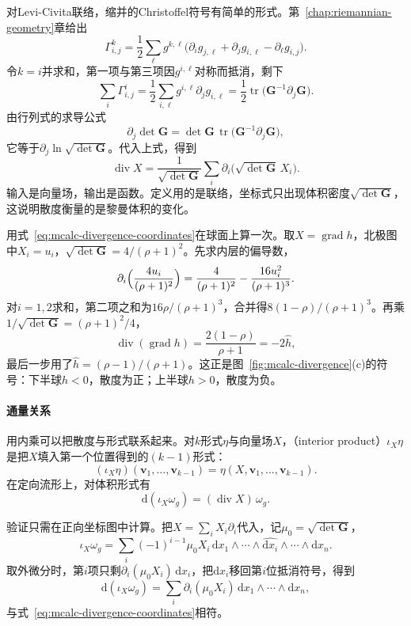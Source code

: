 对Levi-Civita联络，缩并的Christoffel符号有简单的形式。第~\ref{chap:riemannian-geometry}章给出
\[
\Gamma^k_{i,j}=\frac12\sum_\ell g^{k,\ell}\bigl(\partial_ig_{j,\ell}+\partial_jg_{i,\ell}-\partial_\ell g_{i,j}\bigr).
\]
令$k=i$并求和，第一项与第三项因$g^{i,\ell}$对称而抵消，剩下
\[
\sum_i\Gamma^i_{i,j}=\frac12\sum_{i,\ell}g^{i,\ell}\partial_jg_{i,\ell}=\frac12\operatorname{tr}\bigl(\bm G^{-1}\partial_j\bm G\bigr).
\]
由行列式的求导公式
\[
\partial_j\det\bm G=\det\bm G\,\operatorname{tr}\bigl(\bm G^{-1}\partial_j\bm G\bigr),
\]
它等于$\partial_j\ln\sqrt{\det\bm G}$。代入上式，得到
\begin{equation}
\operatorname{div}X=\frac1{\sqrt{\det\bm G}}\sum_i\partial_i\bigl(\sqrt{\det\bm G}\,X_i\bigr).
\label{eq:mcalc-divergence-coordinates}
\end{equation}
输入是向量场，输出是函数。定义用的是联络，坐标式只出现体积密度$\sqrt{\det\bm G}$，这说明散度衡量的是黎曼体积的变化。

用式~\eqref{eq:mcalc-divergence-coordinates}在球面上算一次。取$X=\operatorname{grad}h$，北极图中$X_i=u_i$，$\sqrt{\det\bm G}=4/(\rho+1)^2$。先求内层的偏导数，
\[
\partial_i\Bigl(\frac{4u_i}{(\rho+1)^2}\Bigr)=\frac4{(\rho+1)^2}-\frac{16u_i^2}{(\rho+1)^3}.
\]
对$i=1,2$求和，第二项之和为$16\rho/(\rho+1)^3$，合并得$8(1-\rho)/(\rho+1)^3$。再乘$1/\sqrt{\det\bm G}=(\rho+1)^2/4$，
\[
\operatorname{div}(\operatorname{grad}h)=\frac{2(1-\rho)}{\rho+1}=-2\hat h ,
\]
最后一步用了$\hat h=(\rho-1)/(\rho+1)$。这正是图~\ref{fig:mcalc-divergence}(c)的符号：下半球$h<0$，散度为正；上半球$h>0$，散度为负。

\paragraph{通量关系}
用内乘可以把散度与形式联系起来。对$k$形式$\eta$与向量场$X$，（interior product）$\iota_X\eta$是把$X$填入第一个位置得到的$(k-1)$形式：
\[
(\iota_X\eta)(\bm v_1,\ldots,\bm v_{k-1})=\eta(X,\bm v_1,\ldots,\bm v_{k-1}).
\]
在定向流形上，对体积形式有
\begin{equation}
\mathrm d(\iota_X\omega_g)=(\operatorname{div}X)\,\omega_g .
\label{eq:mcalc-divergence-form}
\end{equation}

验证只需在正向坐标图中计算。把$X=\sum_iX_i\partial_i$代入，记$\mu_0=\sqrt{\det\bm G}$，
\[
\iota_X\omega_g=\sum_i(-1)^{i-1}\mu_0X_i\,\mathrm dx_1\wedge\cdots\wedge\widehat{\mathrm dx_i}\wedge\cdots\wedge\mathrm dx_n .
\]
取外微分时，第$i$项只剩$\partial_i(\mu_0X_i)\,\mathrm dx_i$，把$\mathrm dx_i$移回第$i$位抵消符号，得到
\[
\mathrm d(\iota_X\omega_g)=\sum_i\partial_i(\mu_0X_i)\,\mathrm dx_1\wedge\cdots\wedge\mathrm dx_n ,
\]
与式~\eqref{eq:mcalc-divergence-coordinates}相符。

